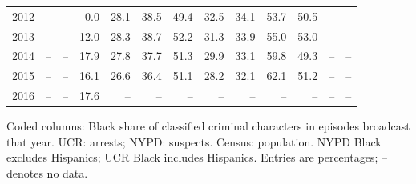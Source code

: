 \begin{center}
\begin{tabular}{@{}rrrrrrrrrrrrr@{}}
2012 & -- & -- & 0.0 & 28.1 & 38.5 & 49.4 & 32.5 & 34.1 & 53.7 & 50.5 & -- & -- \\
2013 & -- & -- & 12.0 & 28.3 & 38.7 & 52.2 & 31.3 & 33.9 & 55.0 & 53.0 & -- & -- \\
2014 & -- & -- & 17.9 & 27.8 & 37.7 & 51.3 & 29.9 & 33.1 & 59.8 & 49.3 & -- & -- \\
2015 & -- & -- & 16.1 & 26.6 & 36.4 & 51.1 & 28.2 & 32.1 & 62.1 & 51.2 & -- & -- \\
2016 & -- & -- & 17.6 & -- & -- & -- & -- & -- & -- & -- & -- & -- \\
\bottomrule
\end{tabular}
\par\smallskip
\parbox{\linewidth}{\footnotesize Coded columns: Black share of classified criminal characters in episodes broadcast that year.  UCR: arrests; NYPD: suspects. Census: population. NYPD Black excludes Hispanics; UCR Black includes Hispanics. Entries are percentages; -- denotes no data.}
\end{center}
